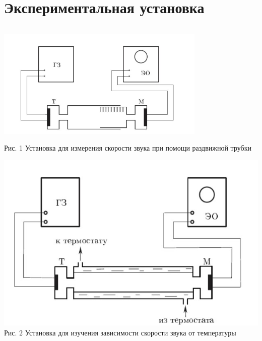 \documentclass[a4paper, 12pt]{article}
\begin{document}
	\section{Экспериментальная установка}
	\begin{center}
		\includegraphics[width=10cm, height=6cm]{"Установка1.jpg"}\\
		Рис. 1 Установка для измерения скорости звука при помощи раздвижной трубки
		
		\includegraphics{"Установка2.jpg"}\\
		Рис. 2 Установка для изучения зависимости скорости звука от температуры
	\end{center}
\end{document}
